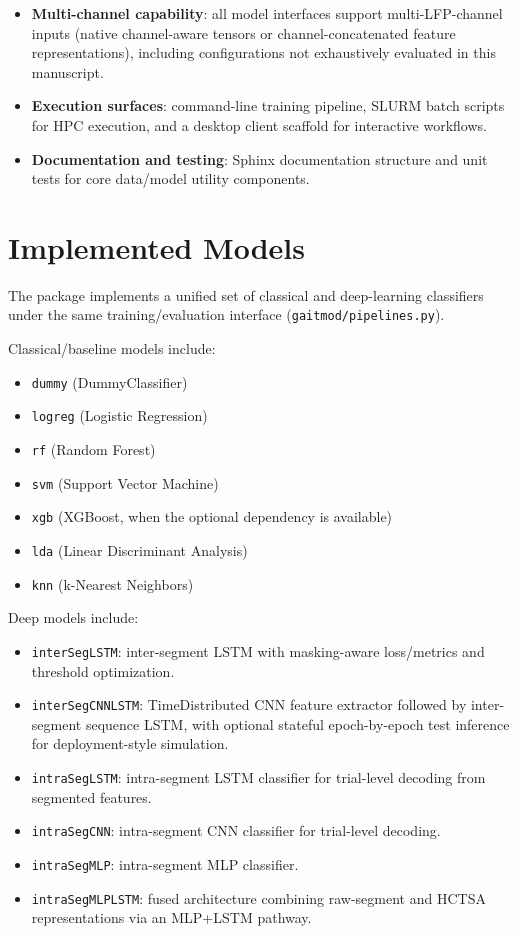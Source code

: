 \begin{itemize}
\item \textbf{Multi-channel capability}: all model interfaces support multi-LFP-channel inputs (native channel-aware tensors or channel-concatenated feature representations), including configurations not exhaustively evaluated in this manuscript.
\item \textbf{Execution surfaces}: command-line training pipeline, SLURM batch scripts for HPC execution, and a desktop client scaffold for interactive workflows.
\item \textbf{Documentation and testing}: Sphinx documentation structure and unit tests for core data/model utility components.
\end{itemize}

\section{Implemented Models}
\label{sec:reproducibility_implemented_models}
The package implements a unified set of classical and deep-learning classifiers under the same training/evaluation interface (\texttt{gaitmod/pipelines.py}).

Classical/baseline models include:
\begin{itemize}
\item \texttt{dummy} (DummyClassifier)
\item \texttt{logreg} (Logistic Regression)
\item \texttt{rf} (Random Forest)
\item \texttt{svm} (Support Vector Machine)
\item \texttt{xgb} (XGBoost, when the optional dependency is available)
\item \texttt{lda} (Linear Discriminant Analysis)
\item \texttt{knn} (k-Nearest Neighbors)
\end{itemize}

Deep models include:
\begin{itemize}
\item \texttt{interSegLSTM}: inter-segment LSTM with masking-aware loss/metrics and threshold optimization.
\item \texttt{interSegCNNLSTM}: TimeDistributed CNN feature extractor followed by inter-segment sequence LSTM, with optional stateful epoch-by-epoch test inference for deployment-style simulation.
\item \texttt{intraSegLSTM}: intra-segment LSTM classifier for trial-level decoding from segmented features.
\item \texttt{intraSegCNN}: intra-segment CNN classifier for trial-level decoding.
\item \texttt{intraSegMLP}: intra-segment MLP classifier.
\item \texttt{intraSegMLPLSTM}: fused architecture combining raw-segment and HCTSA representations via an MLP+LSTM pathway.
\end{itemize}

